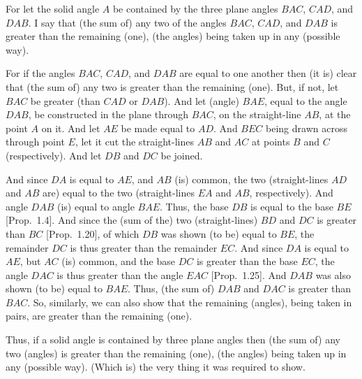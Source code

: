 \begin{Parallel}{}{}
{For let the solid angle $A$ be contained by the three plane angles $BAC$, $CAD$, and $DAB$. I say that (the sum of) any two of the angles $BAC$, $CAD$, and $DAB$ is greater than the remaining (one),
(the angles) being taken up in any (possible way).

For if the angles $BAC$, $CAD$, and $DAB$ are equal to one another
then (it is) clear that (the sum of) any two is greater than
the remaining (one). But, if not, let $BAC$ be greater (than $CAD$ or $DAB$). And let (angle) $BAE$, equal to the angle $DAB$,  be constructed in the plane through $BAC$, on the straight-line $AB$,
at the point $A$ on it. And let $AE$ be made equal to $AD$. And $BEC$
being drawn across through point $E$, let it cut the straight-lines $AB$
and $AC$ at points $B$ and $C$ (respectively). And let
$DB$ and $DC$ be joined.

And since $DA$ is equal to $AE$, and $AB$ (is) common, the
two (straight-lines $AD$ and $AB$ are) equal to the two (straight-lines
$EA$ and $AB$, respectively). And angle $DAB$ (is) equal
to angle $BAE$. Thus, the base $DB$ is equal to the base $BE$ [Prop.~1.4]. And since the
(sum of the) two (straight-lines) $BD$ and $DC$ is greater than $BC$
[Prop.~1.20], of which $DB$ was shown
(to be) equal to $BE$, the  remainder $DC$ is thus greater than the
remainder $EC$. And since $DA$ is equal to $AE$, but
$AC$ (is) common, and the base $DC$ is  greater than the base
$EC$, the angle $DAC$ is thus greater than the angle $EAC$
[Prop.~1.25]. And $DAB$
was also shown (to be) equal to $BAE$. Thus, 
(the sum of) $DAB$ and $DAC$ is greater than $BAC$. So,
similarly, we can also show that the remaining  (angles), being taken in pairs, are greater than the remaining (one).

Thus,  if a solid angle is contained by three plane angles
then (the sum of) any two (angles) is greater than the remaining (one), (the angles) being taken up in any (possible way). (Which is) the very thing it
was required to show.}
\end{Parallel}

